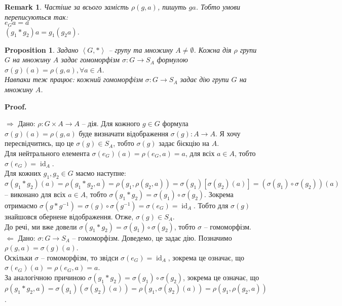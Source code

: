 \documentclass[a4paper, 10pt]{article}
\makeatletter
\def\rightproof{$\boxed{\Rightarrow}$ }
\def\leftproof{$\boxed{\Leftarrow}$ }
\theoremstyle{theoremdd}
\theoremstyle{theoremdd}
\theoremstyle{theoremdd}
\theoremstyle{theoremdd}
\theoremstyle{theoremdd}
\theoremstyle{theoremdd}
\theoremstyle{theoremdd}
\theoremstyle{theoremdd}
\theoremstyle{theoremdd}
\newtheorem{proposition}[theorem]{Proposition}
\theoremstyle{theoremdd}
\theoremstyle{theoremdd}
\newtheorem{remark}[theorem]{Remark}
\theoremstyle{theoremdd}
\theoremstyle{theoremdd}
\theoremstyle{theoremdd}
\theoremstyle{theoremdd}
\renewenvironment{proof}[1][Proof.\\]{\par
\pushQED{\hfill \qed}%
\normalfont \topsep6\p@\@plus6\p@\relax
\trivlist
\item\relax
{\bfseries
#1\@addpunct{.}}\hspace\labelsep\ignorespaces
}{%
\popQED\endtrivlist\@endpefalse
}
\DeclareMathOperator{\id}{id}
\makeatother
\begin{document}
\begin{remark}
Частіше за всього замість $\rho(g,a)$, пишуть $ga$. Тобто умови переписуються так:\\
$e_Ga = a$\\
$(g_1*g_2)a = g_1(g_2a)$.
\end{remark}

\begin{proposition}
Задано $\left< G,*\right>$ -- групу та множину $A \neq \emptyset$. Кожна дія $\rho$ групи $G$ на множину $A$ задає гомоморфізм $\sigma \colon G \to S_A$ формулою $\sigma (g)(a) = \rho(g,a), \forall a \in A$.\\
Навпаки теж працює: кожний гомоморфізм $\sigma \colon G \to S_A$ задає дію групи $G$ на множину $A$.
\end{proposition}

\begin{proof}
\rightproof Дано: $\rho \colon G \times A \to A$ -- дія. Для кожного $g \in G$ формула $\sigma(g)(a) = \rho(g,a)$ буде визначати відображення $\sigma(g) \colon A \to A$. Я хочу пересвідчитись, що це $\sigma(g) \in S_A$, тобто $\sigma(g)$ задає бієкцію на $A$.\\
Для нейтрального елемента $\sigma(e_G)(a) = \rho(e_G,a) = a$, для всіх $a \in A$, тобто $\sigma(e_G) = \id_A$.\\
Для кожних $g_1,g_2 \in G$ маємо наступне:\\
$\sigma (g_1*g_2)(a) = \rho(g_1*g_2,a) = \rho(g_1, \rho(g_2,a)) = \sigma(g_1)[\sigma(g_2)(a)] = (\sigma(g_1) \circ \sigma(g_2))(a)$ -- виконано для всіх $a \in A$, тобто $\sigma (g_1*g_2) = \sigma(g_1) \circ \sigma(g_2)$. Зокрема отримаємо $\sigma(g*g^{-1}) = \sigma(g) \circ \sigma(g^{-1}) = \sigma(e_G) = \id_A$. Тобто для $\sigma(g)$ знайшовся обернене відображення. Отже, $\sigma(g) \in S_A$.\\
До речі, ми вже довели $\sigma(g_1*g_2) = \sigma(g_1) \circ \sigma(g_2)$, тобто $\sigma$ -- гомоморфізм.
\bigskip \\
\leftproof Дано: $\sigma \colon G \to S_A$ -- гомоморфізм. Доведемо, це задає дію. Позначимо $\rho(g,a) = \sigma(g)(a)$.\\
Оскільки $\sigma$ -- гомоморфізм, то звідси $\sigma(e_G) = \id_A$, зокрема це означає, що $\sigma(e_G)(a) = \rho(e_G,a) = a$.\\
За аналогічною причиною $\sigma(g_1*g_2) = \sigma(g_1) \circ \sigma(g_2)$, зокрема це означає, що $\rho(g_1*g_2,a) = \sigma(g_1)(\sigma(g_2)(a)) = \rho(g_1, \sigma(g_2)(a)) = \rho(g_1, \rho(g_2,a))$.
\end{proof}
\end{document}

